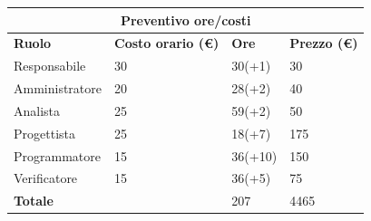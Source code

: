 \documentclass[a4paper, 12pt]{article}
\begin{document}
\begin{center}
	\begin{tabularx}{\textwidth}{|X|X|X|X|}
		\hline
		\multicolumn{4}{|c|}{\textbf{Preventivo ore/costi}}                                      \\
		\hline
		\hline
		\textbf{Ruolo}  & \textbf{Costo orario (\euro)} & \textbf{Ore} & \textbf{Prezzo (\euro)} \\
		\hline
		Responsabile    & 30                            & 30(+1)       & 30                      \\
		\hline
		Amministratore  & 20                            & 28(+2)       & 40                      \\
		\hline
		Analista        & 25                            & 59(+2)       & 50                      \\
		\hline
		Progettista     & 25                            & 18(+7)       & 175                     \\
		\hline
		Programmatore   & 15                            & 36(+10)      & 150                     \\
		\hline
		Verificatore    & 15                            & 36(+5)       & 75                      \\
		\hline
		\hline
		\textbf{Totale} &                               & 207          & 4465                    \\
		\hline
	\end{tabularx}\\[8pt]
	\mbox{}\\
\end{center}
\end{document}
